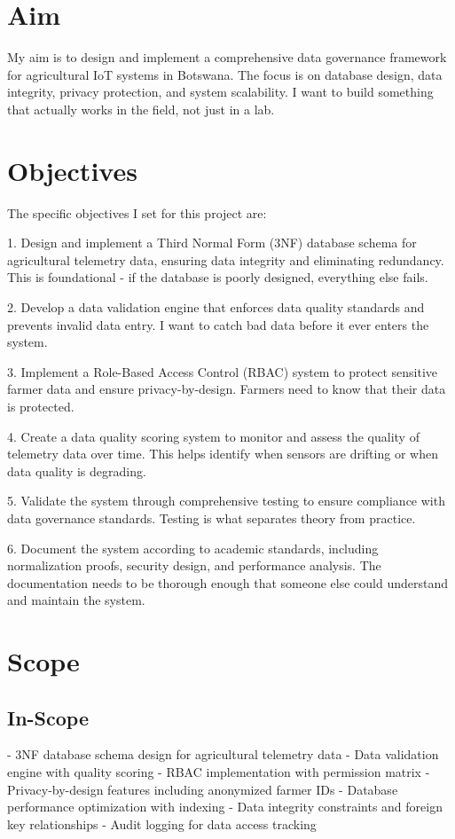 \section{Aim}

My aim is to design and implement a comprehensive data governance framework for agricultural IoT systems in Botswana. The focus is on database design, data integrity, privacy protection, and system scalability. I want to build something that actually works in the field, not just in a lab.

\section{Objectives}

The specific objectives I set for this project are:

1. Design and implement a Third Normal Form (3NF) database schema for agricultural telemetry data, ensuring data integrity and eliminating redundancy. This is foundational - if the database is poorly designed, everything else fails.

2. Develop a data validation engine that enforces data quality standards and prevents invalid data entry. I want to catch bad data before it ever enters the system.

3. Implement a Role-Based Access Control (RBAC) system to protect sensitive farmer data and ensure privacy-by-design. Farmers need to know that their data is protected.

4. Create a data quality scoring system to monitor and assess the quality of telemetry data over time. This helps identify when sensors are drifting or when data quality is degrading.

5. Validate the system through comprehensive testing to ensure compliance with data governance standards. Testing is what separates theory from practice.

6. Document the system according to academic standards, including normalization proofs, security design, and performance analysis. The documentation needs to be thorough enough that someone else could understand and maintain the system.

\section{Scope}

\subsection{In-Scope}
- 3NF database schema design for agricultural telemetry data
- Data validation engine with quality scoring
- RBAC implementation with permission matrix
- Privacy-by-design features including anonymized farmer IDs
- Database performance optimization with indexing
- Data integrity constraints and foreign key relationships
- Audit logging for data access tracking


